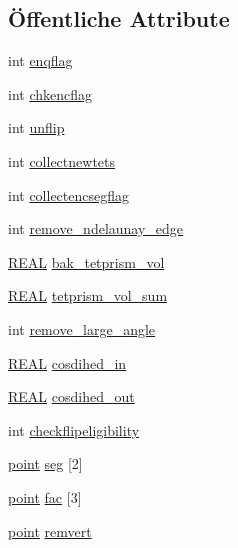 \subsection*{Öffentliche Attribute}
\begin{DoxyCompactItemize}
\item 
int \hyperlink{classtetgenmesh_1_1flipconstraints_ad16c3c6607dd1bedc7b580245ed34f56}{enqflag}
\item 
int \hyperlink{classtetgenmesh_1_1flipconstraints_a5cb16eed34f6726058a81ff226f138f7}{chkencflag}
\item 
int \hyperlink{classtetgenmesh_1_1flipconstraints_aaa71c48602e685babeca9669f8921b10}{unflip}
\item 
int \hyperlink{classtetgenmesh_1_1flipconstraints_abddbd27770a07502372a20c9d0dd346d}{collectnewtets}
\item 
int \hyperlink{classtetgenmesh_1_1flipconstraints_ae443417bfee2fe2d138ef19d1661668d}{collectencsegflag}
\item 
int \hyperlink{classtetgenmesh_1_1flipconstraints_ab0ac97086329360ad119f215bd4fe02b}{remove\-\_\-ndelaunay\-\_\-edge}
\item 
\hyperlink{tetgen_8h_a4b654506f18b8bfd61ad2a29a7e38c25}{R\-E\-A\-L} \hyperlink{classtetgenmesh_1_1flipconstraints_abd1823bc4b973c204c9871630bc7e88b}{bak\-\_\-tetprism\-\_\-vol}
\item 
\hyperlink{tetgen_8h_a4b654506f18b8bfd61ad2a29a7e38c25}{R\-E\-A\-L} \hyperlink{classtetgenmesh_1_1flipconstraints_a8bb8c96375bd68188384dd8cb34e0a28}{tetprism\-\_\-vol\-\_\-sum}
\item 
int \hyperlink{classtetgenmesh_1_1flipconstraints_abc7659ab61a966b1a47560fd07a58ccb}{remove\-\_\-large\-\_\-angle}
\item 
\hyperlink{tetgen_8h_a4b654506f18b8bfd61ad2a29a7e38c25}{R\-E\-A\-L} \hyperlink{classtetgenmesh_1_1flipconstraints_a04bbb705181108809fa35a24fd2b32b0}{cosdihed\-\_\-in}
\item 
\hyperlink{tetgen_8h_a4b654506f18b8bfd61ad2a29a7e38c25}{R\-E\-A\-L} \hyperlink{classtetgenmesh_1_1flipconstraints_a546d64ebfd4f8bb01b5f4f56dde43a07}{cosdihed\-\_\-out}
\item 
int \hyperlink{classtetgenmesh_1_1flipconstraints_a4eb3f0e12749cae8b73f0f80e6f7748c}{checkflipeligibility}
\item 
\hyperlink{classtetgenmesh_ace3fb4f80389185b7c9b18ab69a3dea2}{point} \hyperlink{classtetgenmesh_1_1flipconstraints_a65862c9f061693a1961f96f3f471c95e}{seg} \mbox{[}2\mbox{]}
\item 
\hyperlink{classtetgenmesh_ace3fb4f80389185b7c9b18ab69a3dea2}{point} \hyperlink{classtetgenmesh_1_1flipconstraints_a99946dec792882c06d7608bb9967e5bb}{fac} \mbox{[}3\mbox{]}
\item 
\hyperlink{classtetgenmesh_ace3fb4f80389185b7c9b18ab69a3dea2}{point} \hyperlink{classtetgenmesh_1_1flipconstraints_a1a6025cc57533d98fef46ffbdcbbc83f}{remvert}
\end{DoxyCompactItemize}


